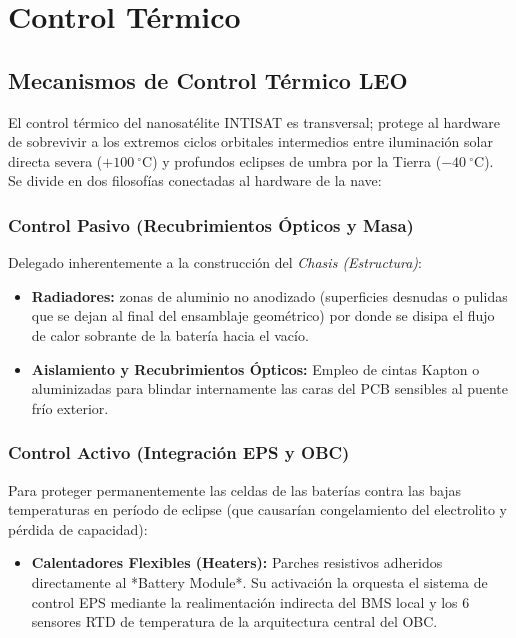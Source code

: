 \chapter{Control Térmico}

\section{Mecanismos de Control Térmico LEO}
El control térmico del nanosatélite INTISAT es transversal; protege al hardware de sobrevivir a los extremos ciclos orbitales intermedios entre iluminación solar directa severa ($+100\ ^\circ\text{C}$) y profundos eclipses de umbra por la Tierra ($-40\ ^\circ\text{C}$). Se divide en dos filosofías conectadas al hardware de la nave:

\subsection{Control Pasivo (Recubrimientos Ópticos y Masa)}
Delegado inherentemente a la construcción del \textit{Chasis (Estructura)}:
\begin{itemize}
    \item \textbf{Radiadores:} zonas de aluminio no anodizado (superficies desnudas o pulidas que se dejan al final del ensamblaje geométrico) por donde se disipa el flujo de calor sobrante de la batería hacia el vacío.
    \item \textbf{Aislamiento y Recubrimientos Ópticos:} Empleo de cintas Kapton o aluminizadas para blindar internamente las caras del PCB sensibles al puente frío exterior. 
\end{itemize}

\subsection{Control Activo (Integración EPS y OBC)}
Para proteger permanentemente las celdas de las baterías contra las bajas temperaturas en período de eclipse (que causarían congelamiento del electrolito y pérdida de capacidad):
\begin{itemize}
    \item \textbf{Calentadores Flexibles (Heaters):} Parches resistivos adheridos directamente al *Battery Module*. Su activación la orquesta el sistema de control EPS mediante la realimentación indirecta del BMS local y los 6 sensores RTD de temperatura de la arquitectura central del OBC.
\end{itemize}

